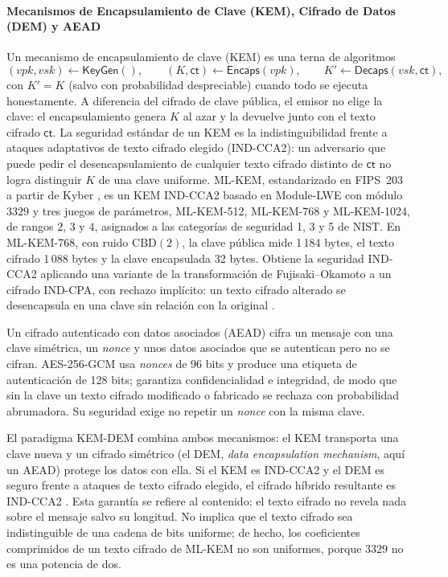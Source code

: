 \paragraph{Mecanismos de Encapsulamiento de Clave (KEM), Cifrado de Datos (DEM) y AEAD}
\label{sec:kem-dem}
Un mecanismo de encapsulamiento de clave (KEM) es una terna de algoritmos
\begin{equation}
(vpk, vsk) \leftarrow \mathsf{KeyGen}(), \qquad (K, \mathsf{ct}) \leftarrow \mathsf{Encaps}(vpk), \qquad K' \leftarrow \mathsf{Decaps}(vsk, \mathsf{ct}),
\end{equation}
con $K' = K$ (salvo con probabilidad despreciable) cuando todo se ejecuta honestamente. A diferencia del cifrado de clave pública, el emisor no elige la clave: el encapsulamiento genera $K$ al azar y la devuelve junto con el texto cifrado $\mathsf{ct}$. La seguridad estándar de un KEM es la indistinguibilidad frente a ataques adaptativos de texto cifrado elegido (IND-CCA2): un adversario que puede pedir el desencapsulamiento de cualquier texto cifrado distinto de $\mathsf{ct}$ no logra distinguir $K$ de una clave uniforme. ML-KEM, estandarizado en FIPS~203 \cite{nist2024fips203} a partir de Kyber \cite{avanzi2021kyber}, es un KEM IND-CCA2 basado en Module-LWE con módulo $3329$ y tres juegos de parámetros, ML-KEM-512, ML-KEM-768 y ML-KEM-1024, de rangos $2$, $3$ y $4$, asignados a las categorías de seguridad 1, 3 y 5 de NIST. En ML-KEM-768, con ruido $\mathrm{CBD}(2)$, la clave pública mide 1\,184 bytes, el texto cifrado 1\,088 bytes y la clave encapsulada 32 bytes. Obtiene la seguridad IND-CCA2 aplicando una variante de la transformación de Fujisaki--Okamoto a un cifrado IND-CPA, con rechazo implícito: un texto cifrado alterado se desencapsula en una clave sin relación con la original \cite{nist2024fips203}.

Un cifrado autenticado con datos asociados (AEAD) cifra un mensaje con una clave simétrica, un \textit{nonce} y unos datos asociados que se autentican pero no se cifran. AES-256-GCM \cite{dworkin2007gcm} usa \textit{nonces} de 96 bits y produce una etiqueta de autenticación de 128 bits; garantiza confidencialidad e integridad, de modo que sin la clave un texto cifrado modificado o fabricado se rechaza con probabilidad abrumadora. Su seguridad exige no repetir un \textit{nonce} con la misma clave.

El paradigma KEM-DEM combina ambos mecanismos: el KEM transporta una clave nueva y un cifrado simétrico (el DEM, \textit{data encapsulation mechanism}, aquí un AEAD) protege los datos con ella. Si el KEM es IND-CCA2 y el DEM es seguro frente a ataques de texto cifrado elegido, el cifrado híbrido resultante es IND-CCA2 \cite{cramer2003design}. Esta garantía se refiere al contenido: el texto cifrado no revela nada sobre el mensaje salvo su longitud. No implica que el texto cifrado sea indistinguible de una cadena de bits uniforme; de hecho, los coeficientes comprimidos de un texto cifrado de ML-KEM no son uniformes, porque $3329$ no es una potencia de dos.

